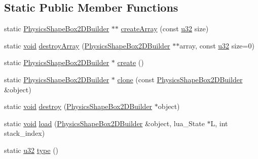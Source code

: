 \subsection*{Static Public Member Functions}
\begin{DoxyCompactItemize}
\item 
static \mbox{\hyperlink{classnjli_1_1_physics_shape_box2_d_builder}{Physics\+Shape\+Box2\+D\+Builder}} $\ast$$\ast$ \mbox{\hyperlink{classnjli_1_1_physics_shape_box2_d_builder_ae5cacfc4548f0b36c4631ff5e37a157d}{create\+Array}} (const \mbox{\hyperlink{_util_8h_a10e94b422ef0c20dcdec20d31a1f5049}{u32}} size)
\item 
static \mbox{\hyperlink{_thread_8h_af1e856da2e658414cb2456cb6f7ebc66}{void}} \mbox{\hyperlink{classnjli_1_1_physics_shape_box2_d_builder_af5d8d7aa9dcb2791a1be28169c206593}{destroy\+Array}} (\mbox{\hyperlink{classnjli_1_1_physics_shape_box2_d_builder}{Physics\+Shape\+Box2\+D\+Builder}} $\ast$$\ast$array, const \mbox{\hyperlink{_util_8h_a10e94b422ef0c20dcdec20d31a1f5049}{u32}} size=0)
\item 
static \mbox{\hyperlink{classnjli_1_1_physics_shape_box2_d_builder}{Physics\+Shape\+Box2\+D\+Builder}} $\ast$ \mbox{\hyperlink{classnjli_1_1_physics_shape_box2_d_builder_a3273b7ee5aca9f70908bfdfdbb9c8a7c}{create}} ()
\item 
static \mbox{\hyperlink{classnjli_1_1_physics_shape_box2_d_builder}{Physics\+Shape\+Box2\+D\+Builder}} $\ast$ \mbox{\hyperlink{classnjli_1_1_physics_shape_box2_d_builder_a61c14aafa279c3c0a6243ec4399903e5}{clone}} (const \mbox{\hyperlink{classnjli_1_1_physics_shape_box2_d_builder}{Physics\+Shape\+Box2\+D\+Builder}} \&object)
\item 
static \mbox{\hyperlink{_thread_8h_af1e856da2e658414cb2456cb6f7ebc66}{void}} \mbox{\hyperlink{classnjli_1_1_physics_shape_box2_d_builder_a181009ebb721b27eade52cbb955fec43}{destroy}} (\mbox{\hyperlink{classnjli_1_1_physics_shape_box2_d_builder}{Physics\+Shape\+Box2\+D\+Builder}} $\ast$object)
\item 
static \mbox{\hyperlink{_thread_8h_af1e856da2e658414cb2456cb6f7ebc66}{void}} \mbox{\hyperlink{classnjli_1_1_physics_shape_box2_d_builder_a3c5646d0ab24eea4247ca6891f484de7}{load}} (\mbox{\hyperlink{classnjli_1_1_physics_shape_box2_d_builder}{Physics\+Shape\+Box2\+D\+Builder}} \&object, lua\+\_\+\+State $\ast$L, int stack\+\_\+index)
\item 
static \mbox{\hyperlink{_util_8h_a10e94b422ef0c20dcdec20d31a1f5049}{u32}} \mbox{\hyperlink{classnjli_1_1_physics_shape_box2_d_builder_aa96bb4f668a8ae62c5d67011dbfd3ec2}{type}} ()
\end{DoxyCompactItemize}
